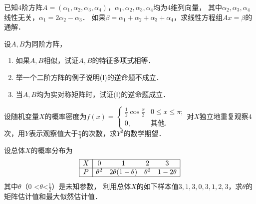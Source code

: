 \documentclass[plain,noanswer,medmath]{../../template/jnuexam}
\begin{document}

\begin{problem}
已知$4$阶方阵$A = (\alpha_1,\alpha_2,\alpha_3,\alpha_4)$，$\alpha_1,\alpha_2,\alpha_3,\alpha_4$均为4维列向量，
其中$\alpha_2,\alpha_3,\alpha_4$线性无关，$\alpha_1 = 2\alpha_2 - \alpha_3$．
如果$\beta = \alpha_1 + \alpha_2 + \alpha_3 + \alpha_4$，求线性方程组$Ax = \beta$的通解．
\end{problem}



\begin{problem}
设$A,B$为同阶方阵，
\begin{enumerate}
\item 如果$A,B$相似，试证$A,B$的特征多项式相等．
\item 举一个二阶方阵的例子说明(\!Ⅰ\!)的逆命题不成立．
\item 当$A,B$均为实对称矩阵时，试证(\!Ⅰ\!)的逆命题成立．
\end{enumerate}
\end{problem}



\begin{problem}
设随机变量$X$的概率密度为$f(x) = \begin{cases}
  \frac{1}{2}\cos \frac{x}{2} & 0 \le x \le \pi ; \\
                           0, & \text{其他}.
\end{cases}$对$X$独立地重复观察$4$次，用$Y$表示观察值大于$\frac{\pi}{3}$的次数，求$Y^2$的数学期望．
\end{problem}



\begin{problem}
设总体$X$的概率分布为
$$\begin{array}{|c|cccc|}
\hline
  X	& 0	       & 1                 & 2        & 3 \\
\hline
  P	& \theta^2 & 2\theta(1-\theta) & \theta^2 &	1-2\theta \\
\hline
\end{array}$$
其中$\theta$（$\text{0 <}\theta \text{<}\frac{1}{2}$）是未知参数，
利用总体$X$的如下样本值$3,1,3,0,3,1,2,3$，求$\theta$的矩阵估计值和最大似然估计值．
\end{problem}
\end{document}
